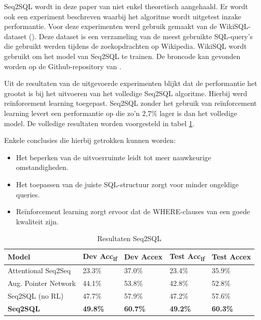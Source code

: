 Seq2SQL wordt in deze paper van \textcite{seq2sqlPaper} niet enkel theoretisch aangehaald. Er wordt ook een experiment beschreven waarbij het algoritme wordt uitgetest inzake performantie.  Voor deze experimenten werd gebruik gemaakt van de WikiSQL-dataset (\textcite{wikisql}). Deze dataset is een verzameling van de meest gebruikte SQL-query’s die gebruikt werden tijdens de zoekopdrachten op Wikipedia. WikiSQL wordt gebruikt om het model van Seq2SQL te trainen. De broncode kan gevonden worden op de Github-repository van \textcite{seq2sql}.

Uit de resultaten van de uitgevoerde experimenten blijkt dat de performantie het grootst is bij het uitvoeren van het volledige Seq2SQL algoritme. Hierbij werd reïnforcement learning toegepast. Seq2SQL zonder het gebruik van reïnforcement learning levert een performantie op die zo’n 2,7\% lager is dan het volledige model. De volledige resultaten worden voorgesteld in tabel \ref{table:seq2sqltab}.

Enkele conclusies die hierbij getrokken kunnen worden:
\begin{itemize}
	\item Het beperken van de uitvoerruimte leidt tot meer nauwkeurige omstandigheden.
	\item Het toepassen van de juiste SQL-structuur zorgt voor minder ongeldige queries.
	\item Reïnforcement learning zorgt ervoor dat de WHERE-clauses van een goede kwaliteit zijn.
\end{itemize}

\begin{table}[ht]
	\centering
	\begin{tabular}{lllll}
		\hline
		Model                & Dev Acc\textsubscript{lf}       & Dev Accex       & Test Acc\textsubscript{lf}      & Test Accex      \\ \hline
		Attentional Seq2Seq  & 23.3\%          & 37.0\%          & 23.4\%          & 35.9\%          \\
		Aug. Pointer Network & 44.1\%          & 53.8\%          & 42.8\%          & 52.8\%          \\ \hline
		Seq2SQL (no RL)      & 47.7\%          & 57.9\%          & 47.2\%          & 57.6\%          \\
		\textbf{Seq2SQL}     & \textbf{49.8\%} & \textbf{60.7\%} & \textbf{49.2\%} & \textbf{60.3\%}
	\end{tabular}
	\caption{Resultaten Seq2SQL}
	\label{table:seq2sqltab}
\end{table} 

